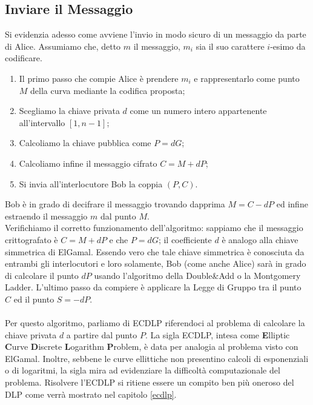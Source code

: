 \documentclass[a4paper,12pt]{tesiinfo}
\begin{document}
\subsection{Inviare il Messaggio}
\label{Crittografia Ellittica}
Si evidenzia adesso come avviene l'invio in modo sicuro di un messaggio da parte di Alice. Assumiamo che, detto $m$ il messaggio, $m_i$ sia il suo carattere $i$-esimo da codificare.
\begin{enumerate}
 \item Il primo passo che compie Alice \`e prendere $m_i$ e rappresentarlo come punto $M$ della curva mediante la codifica proposta;
 \item Scegliamo la chiave privata $d$ come un numero intero appartenente all'intervallo $[1, n-1]$;
 \item Calcoliamo la chiave pubblica come $P = dG$;
 \item Calcoliamo infine il messaggio cifrato $C = M + dP$;
 \item Si invia all'interlocutore Bob la coppia $(P, C)$.
\end{enumerate}
Bob \`e in grado di decifrare il messaggio trovando dapprima $M= C-dP$ ed infine estraendo il messaggio $m$ dal punto $M$.
\\
Verifichiamo il corretto funzionamento dell'algoritmo: sappiamo che il messaggio crittografato \`e $C = M + dP$ e che $P = dG$; il coefficiente $d$ \`e analogo alla chiave simmetrica di ElGamal. Essendo vero che tale chiave simmetrica \`e conosciuta da entrambi gli interlocutori e loro solamente, Bob (come anche Alice) sar\`a in grado di calcolare il punto $dP$ usando l'algoritmo della Double\&Add o la Montgomery Ladder. L'ultimo passo da compiere \`e applicare la Legge di Gruppo tra il punto $C$ ed il punto $S = -dP$.
\\
\\
Per questo algoritmo, parliamo di ECDLP riferendoci al problema di calcolare la chiave privata $d$ a partire dal punto $P$. La sigla ECDLP, intesa come \textbf{E}lliptic \textbf{C}urve \textbf{D}iscrete \textbf{L}ogarithm \textbf{P}roblem, \`e data per analogia al problema visto con ElGamal. Inoltre, sebbene le curve ellittiche non presentino calcoli di esponenziali o di logaritmi, la sigla mira ad evidenziare la difficolt\`a computazionale del problema. Risolvere l'ECDLP si ritiene essere un compito ben pi\`u oneroso del DLP come verr\`a mostrato nel capitolo \ref{ecdlp}.
%
%
%
%
%
%
%
%
%
%
%
%
%
\end{document}
